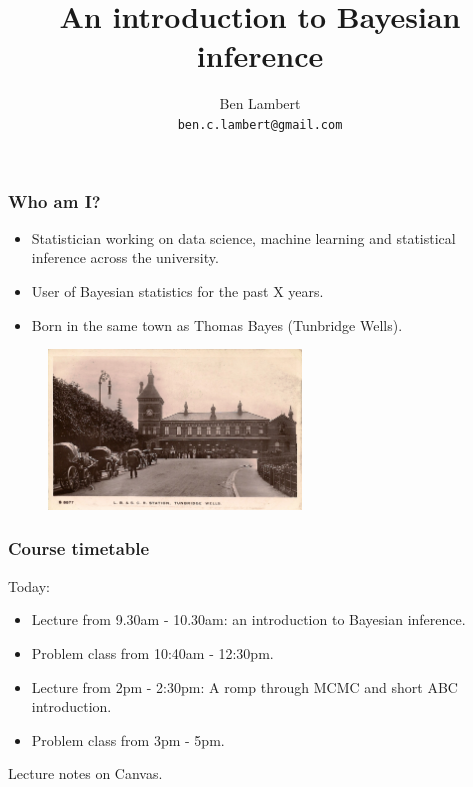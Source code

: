 \documentclass[handout]{beamer}
\title{An introduction to Bayesian inference}
\author[Ben Lambert]{Ben Lambert\inst{1}\\ \texttt{ben.c.lambert@gmail.com}}
\date{}
\institute[University of Oxford]{
\inst{1}University of Oxford}
\begin{document}
\begin{frame}
\titlepage
\end{frame}

\begin{frame}
	\frametitle{Who am I?}
	\begin{itemize}
		\item Statistician working on data science, machine learning and statistical inference across the university.
		\item User of Bayesian statistics for the past X years.
		\item Born in the same town as Thomas Bayes (Tunbridge Wells).
	\end{itemize}
	
	\begin{figure}[ht]
		\centerline{\includegraphics[width=0.6\textwidth]{./animations_figures/tunbridgeWells.jpg}}
	\end{figure}
	
\end{frame}

\begin{frame}
	\frametitle{Course timetable}
	
	Today:
	
	\begin{itemize}
		\item<2-> Lecture from 9.30am - 10.30am: an introduction to Bayesian inference.
		\item<3-> Problem class from 10:40am - 12:30pm.
		\item<4-> Lecture from 2pm - 2:30pm: A romp through MCMC and short ABC introduction.
		\item<5-> Problem class from 3pm - 5pm.
	\end{itemize}
	
	Lecture notes on Canvas.
	
\end{frame}
\end{document}
